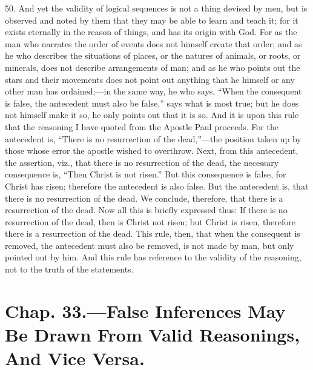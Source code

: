 50. And yet the validity of logical sequences is not a thing devised
by men, but is observed and noted by them that they may be able to
learn and teach it; for it exists eternally in the reason of things,
and has its origin with God. For as the man who narrates the order of
events does not himself create that order; and as he who describes the
situations of places, or the natures of animals, or roots, or
minerals, does not describe arrangements of man; and as he who points
out the stars and their movements does not point out anything that he
himself or any other man has ordained;---in the same way, he who says,
``When the consequent is false, the antecedent must also be false,''
says what is most true; but he does not himself make it so, he only
points out that it is so. And it is upon this rule that the reasoning
I have quoted from the Apostle Paul proceeds. For the antecedent is,
``There is no resurrection of the dead,''---the position taken up by
those whose error the apostle wished to overthrow. Next, from this
antecedent, the assertion, viz., that there is no resurrection of the
dead, the necessary consequence is, ``Then Christ is not risen.'' But
this consequence is false, for Christ has risen; therefore the
antecedent is also false. But the antecedent is, that there is no
resurrection of the dead. We conclude, therefore, that there is a
resurrection of the dead. Now all this is briefly expressed thus: If
there is no resurrection of the dead, then is Christ not risen; but
Christ is risen, therefore there is a resurrection of the dead. This
rule, then, that when the consequent is removed, the antecedent must
also be removed, is not made by man, but only pointed out by him. And
this rule has reference to the validity of the reasoning, not to the
truth of the statements.

\section*{Chap. 33.\smaller---False Inferences May Be Drawn From Valid
Reasonings, And Vice Versa.}

